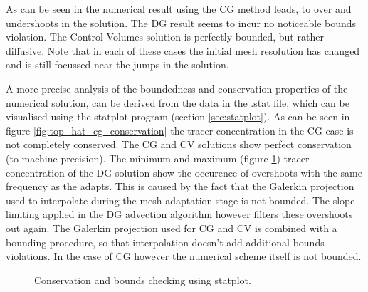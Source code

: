 As can be seen in the numerical result using the CG method leads, to over and 
undershoots in the solution. The DG result seems to incur no noticeable bounds
violation. The Control Volumes solution is perfectly bounded, but rather diffusive. Note that in each of 
these cases the initial mesh resolution has changed and is still focussed near the jumps in the solution.

A more precise analysis of the boundedness and conservation properties of the numerical solution, can be
derived from the data in the .stat file, which can be visualised using the statplot program 
(section \ref{sec:statplot}). As can be seen in figure \ref{fig:top_hat_cg_conservation} the tracer
concentration in the CG case is not completely conserved. 
The CG and CV solutions show perfect conservation (to machine precision). The minimum 
and maximum (figure \ref{fig:top_hat_dg_max}) tracer concentration of the
DG solution show the occurence of overshoots with the same frequency as the adapts. This is caused by the
fact that the Galerkin projection used to interpolate during the mesh adaptation stage is not 
bounded. The slope limiting applied in the DG advection algorithm however filters these overshoots 
out again. The Galerkin projection used for CG and CV is combined with a bounding procedure, so 
that interpolation doesn't add additional bounds violations. In the case of CG however the numerical 
scheme itself is not bounded.

\begin{figure}
  \centering
    \label{fig:top_hat_cg_conservation}
    \label{fig:top_hat_dg_max}
  \caption{Conservation and bounds checking using statplot.}
\end{figure}

